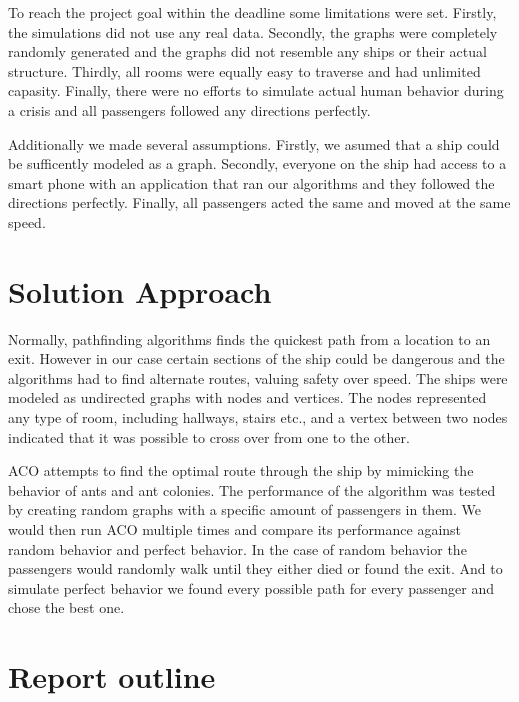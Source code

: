 To reach the project goal within the deadline some limitations were set. Firstly, the simulations did not use 
any real data. Secondly, the graphs were completely randomly generated and the graphs did not resemble
any ships or their actual structure. Thirdly, all rooms were equally easy to traverse and had unlimited capasity. 
Finally, there were no efforts to simulate actual human behavior during a crisis and all passengers followed
any directions perfectly.

Additionally we made several assumptions. Firstly, we asumed that a ship could be sufficently modeled
as a graph. Secondly, everyone on the ship had access to a smart phone with an application that ran our
algorithms and they followed the directions perfectly. Finally, all passengers acted the same and moved at
the same speed.

\section{Solution Approach}

Normally, pathfinding algorithms finds the quickest path from a location to an 
exit. However in our case certain sections of the ship could be dangerous and the algorithms 
had to find alternate routes, valuing safety over speed. The ships were modeled as undirected
graphs with nodes and vertices. The nodes represented any type of room, including
hallways, stairs etc., and a vertex between two nodes indicated that it was possible to
cross over from one to the other.

ACO attempts to find the optimal route through the ship by mimicking the behavior of ants and ant colonies. 
The performance of the algorithm was tested by creating random graphs with a specific amount of
passengers in them. We would then run ACO multiple times and compare its performance against
random behavior and perfect behavior. In the case of random behavior the passengers would randomly
walk until they either died or found the exit. And to simulate perfect behavior we found every possible
path for every passenger and chose the best one.

\section{Report outline}


